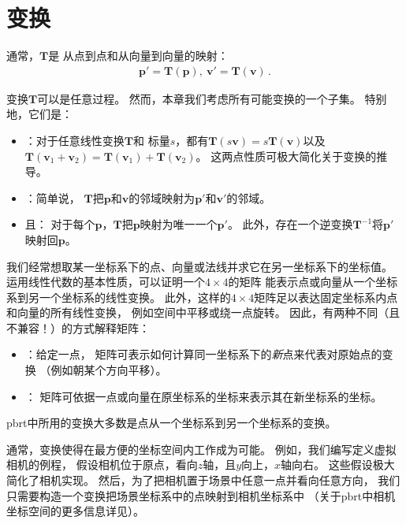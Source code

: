 \section{变换}\label{sec:变换}

通常，$\bm T$是
从点到点和从向量到向量的映射：
\begin{align*}
    \bm p'=\bm T(\bm p), \  \bm v'=\bm T(\bm v)\, .
\end{align*}

变换$\bm T$可以是任意过程。
然而，本章我们考虑所有可能变换的一个子集。
特别地，它们是：
\begin{itemize}
    \item {}：对于任意线性变换$\bm T$和
          标量$s$，都有$\bm T(s\bm v)=s\bm T(\bm v)$以及
          $\bm T(\bm v_1+\bm v_2)=\bm T(\bm v_1)+\bm T(\bm v_2)$。
          这两点性质可极大简化关于变换的推导。
    \item {}：简单说，
          $\bm T$把$\bm p$和$\bm v$的邻域映射为$\bm p'$和$\bm v'$的邻域。
    \item {}且：
          对于每个$\bm p$，$\bm T$把$\bm p$映射为唯一一个$\bm p'$。
          此外，存在一个逆变换$\bm T^{-1}$将$\bm p'$映射回$\bm p$。
\end{itemize}

我们经常想取某一坐标系下的点、向量或法线并求它在另一坐标系下的坐标值。
运用线性代数的基本性质，可以证明一个$4\times4$的矩阵
能表示点或向量从一个坐标系到另一个坐标系的线性变换。
此外，这样的$4\times4$矩阵足以表达固定坐标系内点和向量的所有线性变换，
例如空间中平移或绕一点旋转。
因此，有两种不同（且不兼容！）的方式解释矩阵：
\begin{itemize}
    \item {}：给定一点，
          矩阵可表示如何计算同一坐标系下的\emph{新}点来代表对原始点的变换
          （例如朝某个方向平移）。
    \item {}：
          矩阵可依据一点或向量在原坐标系的坐标来表示其在新坐标系的坐标。
\end{itemize}

pbrt中所用的变换大多数是点从一个坐标系到另一个坐标系的变换。

通常，变换使得在最方便的坐标空间内工作成为可能。
例如，我们编写定义虚拟相机的例程，
假设相机位于原点，看向$z$轴，且$y$向上，$x$轴向右。
这些假设极大简化了相机实现。
然后，为了把相机置于场景中任意一点并看向任意方向，
我们只需要构造一个变换把场景坐标系中的点映射到相机坐标系中
（关于pbrt中相机坐标空间的更多信息详见）。


